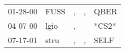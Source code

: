 \begin{supertabular}{lllll}
 01-28-00 &  FUSS &  , &  , &   QBER \\
 04-07-00 &  lgio &  , &    &  *CS2* \\
 07-17-01 &  stru &  , &  , &   SELF \\
\end{supertabular}
